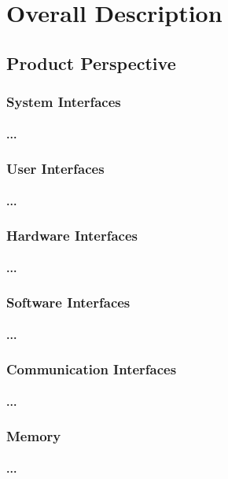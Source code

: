 \documentclass[runningheads,a4paper]{article}
\begin{document}
\section{Overall Description}

\subsection{Product Perspective}

\subsubsection{System Interfaces}
\paragraph{...}
\subsubsection{User Interfaces}
\paragraph{...}
\subsubsection{Hardware Interfaces}
\paragraph{...}
\subsubsection{Software Interfaces}
\paragraph{...}
\subsubsection{Communication Interfaces}
\paragraph{...}
\subsubsection{Memory}
\paragraph{...}
\end{document}
